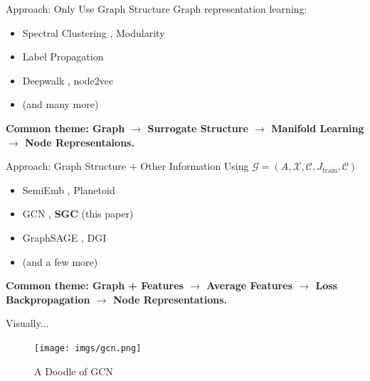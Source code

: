 \documentclass{beamer}
\begin{document}
    \begin{frame}{Approach: Only Use Graph Structure}
        Graph representation learning:
        \pause
        \begin{itemize}
            \item Spectral Clustering \cite{specs}, Modularity \cite{mod}
            \pause
            \item Label Propagation \cite{lp}
            \pause
            \item Deepwalk \cite{dw}, node2vec \cite{nv} 
            \pause
            \item (and many more)
        \end{itemize}
        \pause
        \vspace{1em }
        \bf{Common theme}: Graph \pause$\rightarrow$ Surrogate Structure \pause$\rightarrow$ Manifold Learning \pause$\rightarrow$ Node Representaions.
    \end{frame}

    \begin{frame}{Approach: Graph Structure + Other Information}
        Using $\mathcal{G} = (A, \mathcal{X}, \mathcal{C}, J_{\text{train}}, \mathcal{C})$
        \vspace{1em}
        \pause
        \begin{itemize}
            \item SemiEmb \cite{semiemb}, Planetoid \cite{planetoid}
            \pause 
            \item GCN \cite{gcn}, \textbf{SGC} (this paper)
            \pause
            \item GraphSAGE \cite{sage}, DGI \cite{dgi}
            \pause
            \item (and a few more)
        \end{itemize}
        \pause
        \vspace{1em}
        \bf{Common theme}: Graph + Features \pause$\rightarrow$ Average Features \pause$\rightarrow$ Loss Backpropagation \pause$\rightarrow$ Node Representations.
    \end{frame}

    \begin{frame}{Visually...}
        \begin{figure}
            \centering
            \texttt{[image: imgs/gcn.png]}
            \caption{A Doodle of GCN}
            \label{fig:gcn}
        \end{figure}
    \end{frame}
\end{document}
